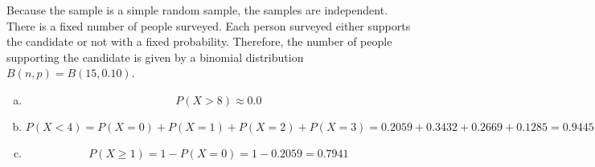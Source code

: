 \documentclass[11pt,letterpaper]{article}
\begin{document}
\sol Because the sample is a simple random sample, the samples are independent. There is a fixed number of people surveyed. Each person surveyed either supports the candidate or not with a fixed probability. Therefore, the number of people supporting the candidate is given by a binomial distribution $B(n, p)= B(15, 0.10)$. 

\begin{enumerate}[(a)]
\item 
	\[
	P(X > 8) \approx 0.0
	\] \pspace

\item 
	\[
	P(X < 4)= P(X= 0) + P(X= 1) + P(X= 2) + P(X= 3)= 0.2059 + 0.3432 + 0.2669 + 0.1285= 0.9445
	\] \pspace
	
\item 
	\[
	P(X \geq 1)= 1 - P(X= 0)= 1 - 0.2059= 0.7941
	\]
\end{enumerate}
\end{document}

